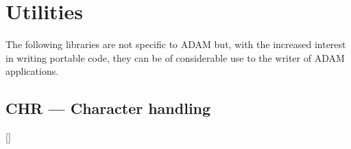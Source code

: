 \newpage

\section{Utilities}

The following libraries are not specific to ADAM but, with the increased 
interest in writing portable code, they can be of considerable use to the 
writer of ADAM applications.

\subsection{CHR --- Character handling} 

\vspace{-9mm}

\hfill []

\vspace{2mm}


